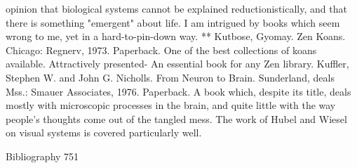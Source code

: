   opinion that biological systems cannot be explained reductionistically, and that there is
  something "emergent" about life. I am intrigued by books which seem wrong to me, yet
  in a hard-to-pin-down way.
** Kutbose, Gyomay. Zen Koans. Chicago: Regnerv, 1973. Paperback. One of the best
  collections of koans available. Attractively presented- An essential book for any Zen
  library. Kuffler, Stephen W. and John G. Nicholls. From Neuron to Brain. Sunderland,
  deals Mss.: Smauer Associates, 1976. Paperback. A book which, despite its title, deals
  mostly with microscopic processes in the brain, and quite little with the way people's
  thoughts come out of the tangled mess. The work of Hubel and Wiesel on visual
  systems is covered particularly well.



Bibliography                                                                            751

